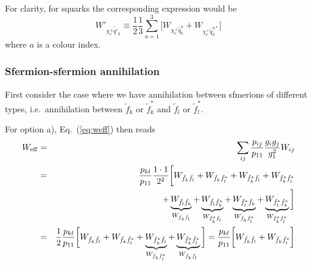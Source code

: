 \documentclass[a4paper,10pt,oneside]{book}
\begin{document}
For clarity, for squarks the corresponding expression would be
\begin{equation}
    W'_{\chi_{c}^\pm \tilde{q'}_{k}} \equiv
    \frac{1}{2} \frac{1}{3}\sum_{a=1}^3 \bigg[ 
    W_{\chi_{c}^+ \tilde{q}_{k}^a} + 
    W_{\chi_{c}^+ \tilde{q}_{k}^{a*}}
    \bigg] 
\end{equation}
where $a$ is a colour index.


\subsubsection{Sfermion-sfermion annihilation}

First consider the case where we have annihilation between sfmerions 
of different types, i.e.\ annihilation between $\tilde{f}_{k}$ or 
$\tilde{f}_{k}^{*}$ and $\tilde{f}_{l}$ or $\tilde{f}_{l}^{*}$.

For option a), Eq.~(\ref{eq:weff}) then reads
\begin{eqnarray}
    W_{\rm eff} & = & \sum_{ij}\frac{p_{ij}}{p_{11}} 
    \frac{g_{i}g_{j}}{g_{1}^2} W_{ij}
    \nonumber \\
    & = & \frac{p_{kl}}{p_{11}} \frac{1 \cdot 1}{2^2}
    \bigg[ 
    W_{\tilde{f}_{k} \tilde{f}_{l}} +
    W_{\tilde{f}_{k} \tilde{f}_{l}^{*}} +
    W_{\tilde{f}_{k}^{*} \tilde{f}_{l}} +
    W_{\tilde{f}_{k}^{*} \tilde{f}_{l}^{*}} \nonumber \\
    & & +
    \underbrace{W_{\tilde{f}_{l} \tilde{f}_{k}}}_
       {W_{\tilde{f}_{k} \tilde{f}_{l}}} +
    \underbrace{W_{\tilde{f}_{l} \tilde{f}_{k}^{*}}}_
       {W_{\tilde{f}_{k}^{*} \tilde{f}_{l}}} +
    \underbrace{W_{\tilde{f}_{l}^{*} \tilde{f}_{k}}}_
       {W_{\tilde{f}_{k} \tilde{f}_{l}^{*}}} +
    \underbrace{W_{\tilde{f}_{l}^{*} \tilde{f}_{k}^{*}}}_
       {W_{\tilde{f}_{k}^{*} \tilde{f}_{l}^{*}}}
    \bigg]  \nonumber \\
    & = &
    \frac{1}{2} \frac{p_{kl}}{p_{11}}
    \bigg[ 
    W_{\tilde{f}_{k} \tilde{f}_{l}} +
    W_{\tilde{f}_{k} \tilde{f}_{l}^{*}} +
    \underbrace{W_{\tilde{f}_{k}^{*} \tilde{f}_{l}}}_
        {W_{\tilde{f}_{k} \tilde{f}_{l}^{*}}} +
    \underbrace{W_{\tilde{f}_{k}^{*} \tilde{f}_{l}^{*}}}_
        {W_{\tilde{f}_{k} \tilde{f}_{l}}}
    \bigg] 
    = \frac{p_{kl}}{p_{11}}
    \bigg[ 
    W_{\tilde{f}_{k} \tilde{f}_{l}} +
    W_{\tilde{f}_{k} \tilde{f}_{l}^{*}}
    \bigg] \label{eq:weffsfsf-a}
\end{eqnarray}    
\end{document}
